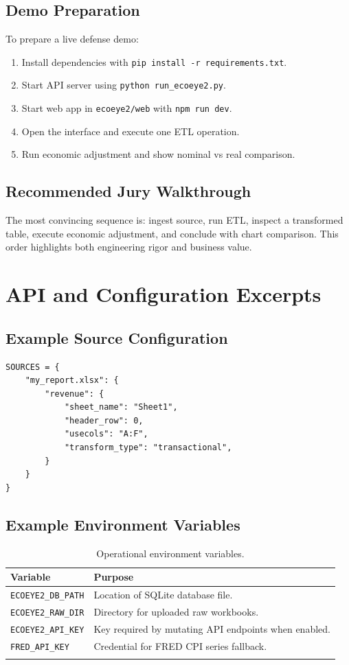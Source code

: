 \documentclass[12pt,a4paper]{report}
\begin{document}
\section{Demo Preparation}
To prepare a live defense demo:
\begin{enumerate}[leftmargin=1.5em]
  \item Install dependencies with \texttt{pip install -r requirements.txt}.
  \item Start API server using \texttt{python run\_ecoeye2.py}.
  \item Start web app in \texttt{ecoeye2/web} with \texttt{npm run dev}.
  \item Open the interface and execute one ETL operation.
  \item Run economic adjustment and show nominal vs real comparison.
\end{enumerate}

\section{Recommended Jury Walkthrough}
The most convincing sequence is: ingest source, run ETL, inspect a transformed table, execute economic adjustment, and conclude with chart comparison. This order highlights both engineering rigor and business value.

\chapter{API and Configuration Excerpts}
\section{Example Source Configuration}
\begin{lstlisting}[style=py]
SOURCES = {
    "my_report.xlsx": {
        "revenue": {
            "sheet_name": "Sheet1",
            "header_row": 0,
            "usecols": "A:F",
            "transform_type": "transactional",
        }
    }
}
\end{lstlisting}

\section{Example Environment Variables}
\begin{longtable}{p{}p{}}
\toprule
\textbf{Variable} & \textbf{Purpose} \\
\midrule
\texttt{ECOEYE2\_DB\_PATH} & Location of SQLite database file. \\
\texttt{ECOEYE2\_RAW\_DIR} & Directory for uploaded raw workbooks. \\
\texttt{ECOEYE2\_API\_KEY} & Key required by mutating API endpoints when enabled. \\
\texttt{FRED\_API\_KEY} & Credential for FRED CPI series fallback. \\
\bottomrule
\caption{Operational environment variables.}
\end{longtable}
\end{document}
